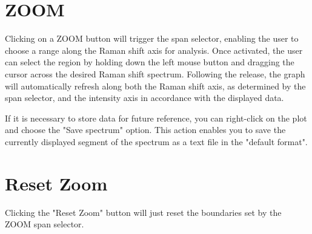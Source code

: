 \section{ZOOM}
Clicking on a ZOOM button will trigger the span selector, enabling the user to choose a range along the Raman shift axis for analysis. Once activated, the user can select the region by holding down the left mouse button and dragging the cursor across the desired Raman shift spectrum. Following the release, the graph will automatically refresh along both the Raman shift axis, as determined by the span selector, and the intensity axis in accordance with the displayed data.
\par
If it is necessary to store data for future reference, you can right-click on the plot and choose the "Save spectrum" option. This action enables you to save the currently displayed segment of the spectrum as a text file in the "default format".
\section{Reset Zoom}
Clicking the "Reset Zoom" button will just reset the boundaries set by the ZOOM span selector.
